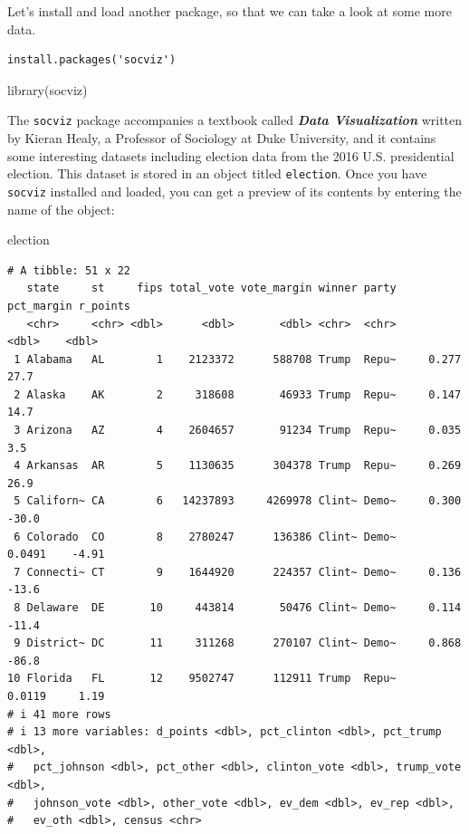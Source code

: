 \documentclass[
  letterpaper,
]{book}
\newenvironment{Shaded}{\begin{snugshade}}{\end{snugshade}}
\newcommand{\FunctionTok}[1]{\textcolor[rgb]{0.28,0.35,0.67}{#1}}
\newcommand{\NormalTok}[1]{\textcolor[rgb]{0.00,0.23,0.31}{#1}}
\begin{document}
Let's install and load another package, so that we can take a look at
some more data.

\begin{verbatim}
install.packages('socviz')
\end{verbatim}

\begin{Shaded}
\begin{Highlighting}[]
\FunctionTok{library}\NormalTok{(socviz)}
\end{Highlighting}
\end{Shaded}

The \texttt{socviz} package accompanies a textbook called
\textbf{\emph{Data Visualization}} written by Kieran Healy, a Professor
of Sociology at Duke University, and it contains some interesting
datasets including election data from the 2016 U.S. presidential
election. This dataset is stored in an object titled \texttt{election}.
Once you have \texttt{socviz} installed and loaded, you can get a
preview of its contents by entering the name of the object:

\begin{Shaded}
\begin{Highlighting}[]
\NormalTok{election}
\end{Highlighting}
\end{Shaded}

\begin{verbatim}
# A tibble: 51 x 22
   state     st     fips total_vote vote_margin winner party pct_margin r_points
   <chr>     <chr> <dbl>      <dbl>       <dbl> <chr>  <chr>      <dbl>    <dbl>
 1 Alabama   AL        1    2123372      588708 Trump  Repu~     0.277     27.7 
 2 Alaska    AK        2     318608       46933 Trump  Repu~     0.147     14.7 
 3 Arizona   AZ        4    2604657       91234 Trump  Repu~     0.035      3.5 
 4 Arkansas  AR        5    1130635      304378 Trump  Repu~     0.269     26.9 
 5 Californ~ CA        6   14237893     4269978 Clint~ Demo~     0.300    -30.0 
 6 Colorado  CO        8    2780247      136386 Clint~ Demo~     0.0491    -4.91
 7 Connecti~ CT        9    1644920      224357 Clint~ Demo~     0.136    -13.6 
 8 Delaware  DE       10     443814       50476 Clint~ Demo~     0.114    -11.4 
 9 District~ DC       11     311268      270107 Clint~ Demo~     0.868    -86.8 
10 Florida   FL       12    9502747      112911 Trump  Repu~     0.0119     1.19
# i 41 more rows
# i 13 more variables: d_points <dbl>, pct_clinton <dbl>, pct_trump <dbl>,
#   pct_johnson <dbl>, pct_other <dbl>, clinton_vote <dbl>, trump_vote <dbl>,
#   johnson_vote <dbl>, other_vote <dbl>, ev_dem <dbl>, ev_rep <dbl>,
#   ev_oth <dbl>, census <chr>
\end{verbatim}
\end{document}
